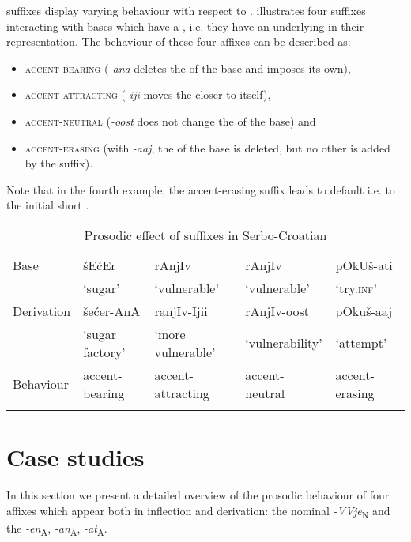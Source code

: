 \documentclass[output=paper, colorlinks, citecolor=brown, newtxmath]{langsci/langscibook}
\begin{document}
 suffixes display varying behaviour with respect to .  illustrates four suffixes interacting with bases which have a , i.e. they have an underlying  in their representation. The behaviour of these four affixes can be described as:\begin{itemize}
  \item \textsc{accent-bearing} (\textit{-ana} deletes the  of the base and imposes its own),
  \item \textsc{accent-attracting} (\textit{-iji} moves the  closer to itself),
  \item \textsc{accent-neutral} (\textit{-oost} does not change the  of the base) and
  \item \textsc{accent-erasing} (with \textit{-aaj}, the  of the base is deleted, but no other  is added by the suffix).
  \end{itemize}
Note that in the fourth example, the accent-erasing suffix leads to default  i.e. to the initial short .

\begin{table}
\small
\caption{Prosodic effect of suffixes in Serbo-Croatian}
\label{tab2}
 \begin{tabular}{l l l l l }
\lsptoprule
Base  & šEćEr  & rAnjIv  & rAnjIv  & pOkUš-ati  \\
& `sugar' & `vulnerable' & `vulnerable' & `try.\textsc{inf}'\smallskip \\
Derivation & šećer-AnA   & ranjIv-Ijii  & rAnjIv-oost  & pOkuš-aaj   \\
 &  `sugar factory' & `more vulnerable' & `vulnerability' & `attempt'\smallskip  \\
Behaviour   & accent-bearing & accent-attracting & accent-neutral & accent-erasing \\
 \lspbottomrule
 \end{tabular}
\end{table}

\section{Case studies} \label{sec:simonovic:4}

In this section we present a detailed overview of the prosodic behaviour of four  affixes which appear both in inflection and derivation: the nominal \textit{-VVje}\textsubscript{N}  and the  \textit{-en}\textsubscript{A}, \textit{-an}\textsubscript{A}, \textit{-at}\textsubscript{A}.
\end{document}
